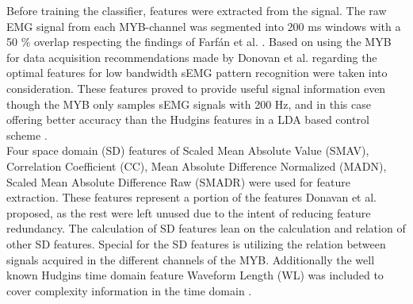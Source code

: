 	
Before training the classifier, features were extracted from the signal. The raw EMG signal from each MYB-channel was segmented into 200 ms windows with a 50 \% overlap respecting the findings of Farfán et al. \cite{Farfan2010}. Based on using the MYB for data acquisition recommendations made by Donovan et al. \cite{Donovan2017} regarding the optimal features for low bandwidth sEMG pattern recognition were taken into consideration. These features proved to provide useful signal information even though the MYB only samples sEMG signals with 200 Hz, and in this case offering better accuracy than the Hudgins features \cite{Hudgins1993} in a LDA based control scheme \cite{Donovan2017}. \\
Four space domain (SD) features of Scaled Mean Absolute Value (SMAV), Correlation Coefficient (CC), Mean Absolute Difference Normalized (MADN), Scaled Mean Absolute Difference Raw (SMADR) were used for feature extraction. These features represent a portion of the features Donavan et al. \cite{Donovan2017} proposed, as the rest were left unused due to the intent of reducing feature redundancy. The calculation of SD features lean on the calculation and relation of other SD features. Special for the SD features is utilizing the relation between signals acquired in the different channels of the MYB. Additionally the well known Hudgins time domain feature Waveform Length (WL) was included to cover complexity information in the time domain \cite{Phiny2012}. %

